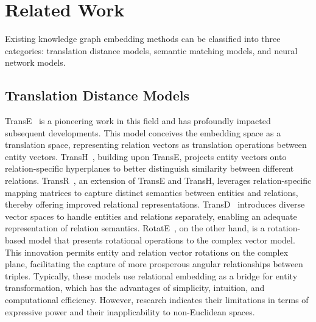 \documentclass[letterpaper]{article} %
\begin{document}
\section{Related Work}
Existing knowledge graph embedding methods can be classified into three categories: translation distance models, semantic matching models, and neural network models.

\subsection{Translation Distance Models}
TransE~\cite{TransE} is a pioneering work in this field and has profoundly impacted subsequent developments. This model conceives the embedding space as a translation space, representing relation vectors as translation operations between entity vectors. TransH~\cite{TransH}, building upon TransE, projects entity vectors onto relation-specific hyperplanes to better distinguish similarity between different relations. TransR~\cite{TransR}, an extension of TransE and TransH, leverages relation-specific mapping matrices to capture distinct semantics between entities and relations, thereby offering improved relational representations. TransD~\cite{TransD} introduces diverse vector spaces to handle entities and relations separately, enabling an adequate representation of relation semantics. RotatE~\cite{RotatE}, on the other hand, is a rotation-based model that presents rotational operations to the complex vector model. This innovation permits entity and relation vector rotations on the complex plane, facilitating the capture of more prosperous angular relationships between triples. Typically, these models use relational embedding as a bridge for entity transformation, which has the advantages of simplicity, intuition, and computational efficiency. However, research indicates their limitations in terms of expressive power and their inapplicability to non-Euclidean spaces.
\end{document}
